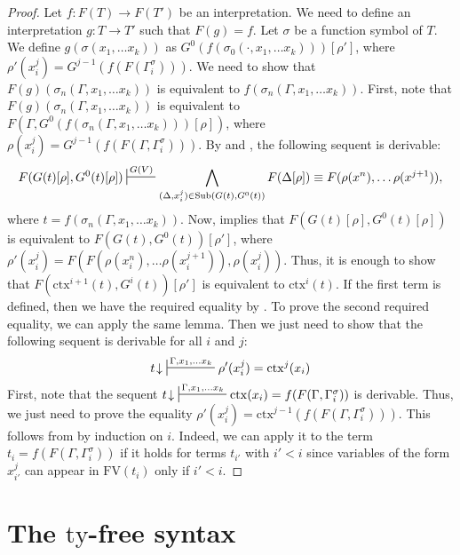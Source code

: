 \documentclass[reqno]{amsart}
\theoremstyle{definition}
\theoremstyle{remark}
\newcommand{\fs}[1]{\mathrm{#1}}
\newcommand{\FV}{\fs{FV}}
\newcommand{\ty}{\fs{ty}}
\newcommand{\ctx}{\fs{ctx}}
\newcommand{\sub}{\fs{Sub}}
\numberwithin{figure}{section}
\begin{document}
\begin{proof}
Let $f : F(T) \to F(T')$ be an interpretation.
We need to define an interpretation $g : T \to T'$ such that $F(g) = f$.
Let $\sigma$ be a function symbol of $T$.
We define $g(\sigma(x_1, \ldots x_k))$ as $G^0(f(\sigma_0(\cdot, x_1, \ldots x_k)))[\rho']$, where $\rho'(x_i^j) = G^{j-1}(f(F(\Gamma^\sigma_i)))$.
We need to show that $F(g)(\sigma_n(\Gamma, x_1, \ldots x_k))$ is equivalent to $f(\sigma_n(\Gamma, x_1, \ldots x_k))$.
First, note that $F(g)(\sigma_n(\Gamma, x_1, \ldots x_k))$ is equivalent to $F(\Gamma, G^0(f(\sigma_n(\Gamma, x_1, \ldots x_k)))[\rho])$, where $\rho(x_i^j) = G^{j-1}(f(F(\Gamma,\Gamma^\sigma_i)))$.
By  and , the following sequent is derivable:
\[ F(G(t)[\rho], G^0(t)[\rho]) \sststile{}{G(V)} \bigwedge_{(\Delta,x_i^j) \in \sub(G(t), G^0(t))} F(\Delta[\rho]) \equiv F(\rho(x^n), \ldots \rho(x^{j+1})), \]
where $t = f(\sigma_n(\Gamma, x_1, \ldots x_k))$.
Now,  implies that $F(G(t)[\rho], G^0(t)[\rho])$ is equivalent to $F(G(t), G^0(t))[\rho']$, where $\rho'(x_i^j) = F(F(\rho(x_i^n), \ldots \rho(x_i^{j+1})), \rho(x_i^j))$.
Thus, it is enough to show that $F(\ctx^{i+1}(t), G^i(t))[\rho']$ is equivalent to $\ctx^i(t)$.
If the first term is defined, then we have the required equality by .
To prove the second required equality, we can apply the same lemma.
Then we just need to show that the following sequent is derivable for all $i$ and $j$:
\[ t\!\downarrow\ \sststile{}{\Gamma, x_1, \ldots x_k} \rho'(x_i^j) = \ctx^j(x_i) \]
First, note that the sequent $t\!\downarrow\ \sststile{}{\Gamma, x_1, \ldots x_k} \ctx(x_i) = f(F(\Gamma, \Gamma^\sigma_i))$ is derivable.
Thus, we just need to prove the equality $\rho'(x_i^j) = \ctx^{j-1}(f(F(\Gamma, \Gamma^\sigma_i)))$.
This follows from  by induction on $i$.
Indeed, we can apply it to the term $t_i = f(F(\Gamma, \Gamma^\sigma_i))$ if it holds for terms $t_{i'}$ with $i' < i$ since variables of the form $x_{i'}^j$ can appear in $\FV(t_i)$ only if $i' < i$.
\end{proof}

\section{The $\ty$-free syntax}
\label{sec:types}



\end{document}
